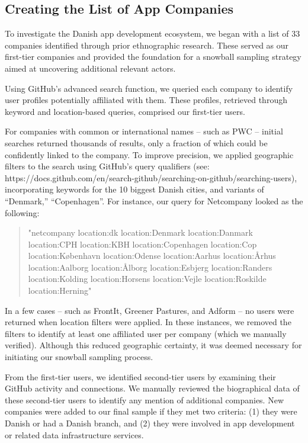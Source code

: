 \subsection{Creating the List of App Companies}

To investigate the Danish app development ecosystem, we began with a list of 33 companies identified through prior ethnographic research. These served as our first-tier companies and provided the foundation for a snowball sampling strategy aimed at uncovering additional relevant actors.

Using GitHub’s advanced search function, we queried each company to identify user profiles potentially affiliated with them. These profiles, retrieved through keyword and location-based queries, comprised our first-tier users.

For companies with common or international names -- such as PWC -- initial searches returned thousands of results, only a fraction of which could be confidently linked to the company. To improve precision, we applied geographic filters to the search using GitHub’s query qualifiers (see: https://docs.github.com/en/search-github/searching-on-github/searching-users), incorporating keywords for the 10 biggest Danish cities, and variants of “Denmark,” “Copenhagen”. For instance, our query for Netcompany looked as the following:

\begin{quote}
\ttfamily\small
"netcompany location:dk location:Denmark location:Danmark location:CPH location:KBH location:Copenhagen location:Cop location:København location:Odense location:Aarhus location:Århus location:Aalborg location:Ålborg location:Esbjerg location:Randers location:Kolding location:Horsens location:Vejle location:Roskilde location:Herning"
\end{quote}

In a few cases -- such as FrontIt, Greener Pastures, and Adform -- no users were returned when location filters were applied. In these instances, we removed the filters to identify at least one affiliated user per company (which we manually verified). Although this reduced geographic certainty, it was deemed necessary for initiating our snowball sampling process.

From the first-tier users, we identified second-tier users by examining their GitHub activity and connections. We manually reviewed the biographical data of these second-tier users to identify any mention of additional companies. New companies were added to our final sample if they met two criteria: (1) they were Danish or had a Danish branch, and (2) they were involved in app development or related data infrastructure services.

